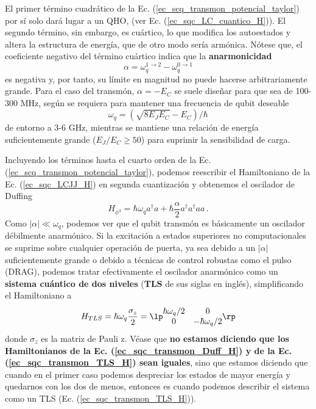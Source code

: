     El primer término cuadrático de la Ec. (\ref{ec_scq_transmon_potencial_taylor}) por sí solo dará lugar a un QHO, (ver Ec. (\ref{ec_sqc_LC_cuantico_H})). El segundo término, sin embargo, es cuártico, lo que modifica los autoestados y altera la estructura de energía, que de otro modo sería armónica. Nótese que, el coeficiente negativo del término cuártico indica que la \textbf{anarmonicidad} 
    \begin{equation} \label{ec_scq_anarmonicidad}
        \alpha = \omega_q^{1 \rightarrow 2} - \omega_q^{0 \rightarrow 1} 
    \end{equation}
    es negativa y, por tanto, su límite en magnitud no puede hacerse arbitrariamente grande. Para el caso del transmón, $\alpha = - E_C$ se suele diseñar para que sea de 100-300 MHz, según se requiera para mantener una frecuencia de qubit deseable 
    \begin{equation}
        \omega_q = (\sqrt{8 E_J E_C} - E_C)/\hbar 
    \end{equation}
    de entorno a 3-6 GHz, mientras se mantiene una relación de energía suficientemente grande ($E_J/E_C \geq 50$) para suprimir la sensibilidad de carga.



    Incluyendo los términos hasta el cuarto orden de la Ec. (\ref{ec_scq_transmon_potencial_taylor}), podemos reescribir el Hamiltoniano de la Ec. (\ref{ec_sqc_LCJJ_H}) en segunda cuantización y obtenemos el oscilador de Duffing
    \begin{equation} \label{ec_sqc_transmon_Duff_H}
        H_{\phi^4} = \hbar \omega_q a^\dagger a + \hbar \frac{\alpha}{2} a^\dagger a^\dagger a a\, .
    \end{equation}
    Como $|\alpha| \ll \omega_q$, podemos ver que el qubit transmón es básicamente un oscilador débilmente anarmónico. Si la excitación a estados superiores no computacionales se suprime sobre cualquier operación de puerta, ya sea debido a un $|\alpha|$ suficientemente grande o debido a técnicas de control robustas como el pulso (DRAG), podemos tratar efectivamente el oscilador anarmónico como un \textbf{sistema cuántico de dos niveles} (\textbf{TLS} de sus siglas en inglés), simplificando el Hamiltoniano a
    \begin{equation} \label{ec_sqc_transmon_TLS_H}
        H_{TLS} = 
        \hbar \omega_q \frac{\sigma_z}{2} = 
        \lp \begin{matrix}
        \hbar \omega_q/2 & 0 \\
        0 & -\hbar \omega_q /2
        \end{matrix} \rp
    \end{equation}
    donde $\sigma_z$ es la matriz de Pauli z. Véase que \textbf{no estamos diciendo que los Hamiltonianos de la Ec. (\ref{ec_sqc_transmon_Duff_H}) y de la Ec. (\ref{ec_sqc_transmon_TLS_H}) sean iguales}, sino que estamos diciendo que cuando en el primer caso podemos despreciar los estados de mayor energía y quedarnos con los dos de menos, entonces es cuando podemos describir el sistema como un TLS (Ec. (\ref{ec_sqc_transmon_TLS_H})). 

